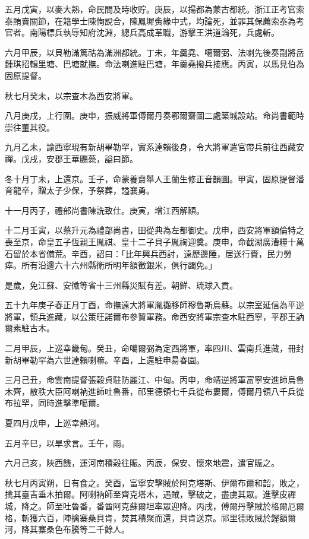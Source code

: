 \begin{pinyinscope}
五月戊寅，以麥大熟，命民間及時收貯。庚辰，以揚都為蒙古都統。浙江正考官索泰賄賣關節，在籍學士陳恂說合，陳鳳墀夤緣中式，均論死，並罪其保薦索泰為考官者。南陽標兵執辱知府沈淵，總兵高成革職，游擊王洪道論死，兵處斬。

六月甲辰，以貝勒滿篤祜為滿洲都統。丁未，年羹堯、噶爾弼、法喇先後奏副將岳鍾琪招輯里塘、巴塘就撫。命法喇進駐巴塘，年羹堯撥兵接應。丙寅，以馬見伯為固原提督。

秋七月癸未，以宗查木為西安將軍。

八月庚戌，上行圍。庚申，振威將軍傅爾丹奏鄂爾齋圖二處築城設站。命尚書範時崇往董其役。

九月乙未，諭西寧現有新胡畢勒罕，實系達賴後身，令大將軍遣官帶兵前往西藏安禪。戊戌，安郡王華颺薨，謚曰節。

冬十月丁未，上還京。壬子，命蒙養齋舉人王蘭生修正音韻圖。甲寅，固原提督潘育龍卒，贈太子少保，予祭葬，謚襄勇。

十一月丙子，禮部尚書陳詵致仕。庚寅，增江西解額。

十二月壬寅，以蔡升元為禮部尚書，田從典為左都御史。戊申，西安將軍額倫特之喪至京，命皇五子恆親王胤祺、皇十二子貝子胤祹迎奠。庚申，命截湖廣漕糧十萬石留於本省備荒。辛酉，詔曰：「比年興兵西討，遠歷邊陲，居送行賚，民力勞瘁。所有沿邊六十六州縣衛所明年額徵銀米，俱行蠲免。」

是歲，免江蘇、安徽等省十三州縣災賦有差。朝鮮、琉球入貢。

五十九年庚子春正月丁酉，命撫遠大將軍胤禵移師穆魯斯烏蘇。以宗室延信為平逆將軍，領兵進藏，以公策旺諾爾布參贊軍務。命西安將軍宗查木駐西寧，平郡王訥爾素駐古木。

二月甲辰，上巡幸畿甸。癸丑，命噶爾弼為定西將軍，率四川、雲南兵進藏，冊封新胡畢勒罕為六世達賴喇嘛。辛酉，上還駐申昜春園。

三月己丑，命雲南提督張穀貞駐防麗江、中甸。丙申，命靖逆將軍富寧安進師烏魯木齊，散秩大臣阿喇衲進師吐魯番，祁里德領七千兵從布婁爾，傅爾丹領八千兵從布拉罕，同時進擊準噶爾。

夏四月戊申，上巡幸熱河。

五月辛巳，以旱求言。壬午，雨。

六月己亥，陜西饑，運河南積穀往賑。丙辰，保安、懷來地震，遣官賑之。

秋七月丙寅朔，日有食之。癸酉，富寧安擊賊於阿克塔斯、伊爾布爾和韶，敗之，擒其臺吉垂木拍爾。阿喇衲師至齊克塔木，遇賊，擊破之，盡虜其眾。進擊皮禪城，降之。師至吐魯番，番酋阿克蘇爾坦率眾迎降。丙戌，傅爾丹擊賊於格爾厄爾格，斬獲六百，陣擒寨桑貝肯，焚其積聚而還，貝肯送京。祁里德敗賊於鏗額爾河，降其寨桑色布騰等二千餘人。


\end{pinyinscope}
